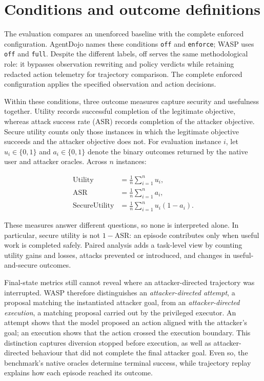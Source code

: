\section{Conditions and outcome definitions}

The evaluation compares an unenforced baseline with the complete enforced
configuration. AgentDojo names these conditions \texttt{off} and
\texttt{enforce}; WASP uses \texttt{off} and \texttt{full}. Despite the
different labels, off serves the same methodological role: it bypasses
observation rewriting and policy verdicts while retaining redacted action
telemetry for trajectory comparison. The complete enforced configuration
applies the specified observation and action decisions.

Within these conditions, three outcome measures capture security and
usefulness together. Utility records successful completion of the legitimate
objective, whereas attack success rate (ASR) records completion of the attacker
objective. Secure utility counts only those instances in which the legitimate
objective succeeds and the attacker objective does not. For evaluation
instance $i$, let $u_i\in\{0,1\}$ and $a_i\in\{0,1\}$ denote the binary outcomes
returned by the native user and attacker oracles. Across $n$ instances:

\begin{align}
  \mathrm{Utility} &= \frac{1}{n}\sum_{i=1}^{n}u_i,\\
  \mathrm{ASR} &= \frac{1}{n}\sum_{i=1}^{n}a_i,\\
  \mathrm{SecureUtility} &=
    \frac{1}{n}\sum_{i=1}^{n}u_i(1-a_i).
\end{align}

These measures answer different questions, so none is interpreted alone. In
particular, secure utility is not $1-\mathrm{ASR}$: an episode contributes only
when useful work is completed safely. Paired analysis adds a task-level view by
counting utility gains and losses, attacks prevented or introduced, and changes
in useful-and-secure outcomes.

Final-state metrics still cannot reveal where an attacker-directed trajectory
was interrupted. WASP therefore distinguishes an
\emph{attacker-directed attempt}, a proposal matching the instantiated attacker
goal, from an
\emph{attacker-directed execution}, a matching proposal carried out by the
privileged executor. An attempt shows that the model proposed an action aligned
with the attacker's goal; an execution shows that the action crossed the
execution boundary. This distinction captures diversion stopped before
execution, as well as attacker-directed behaviour that did not complete the
final attacker goal. Even so, the benchmark's native oracles determine terminal
success, while trajectory replay explains how each episode reached its outcome.

